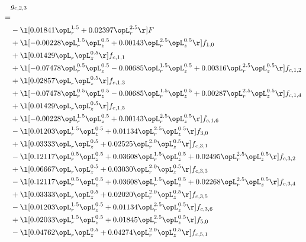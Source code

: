 \begin{alignat}{2} 
\label{eq:g_23_0} 
& g_{c,2,3} \nonumber \\ 
 = \\ 
& - \l[  0.01841 \opL_r^{1.5} +  0.02397 \opL_r^{2.5}  \r] F \nonumber \\ 
& + \l[  -0.00228 \opL_r^{1.5} \opL_z^{0.5} +  0.00143 \opL_r^{2.5} \opL_z^{0.5}  \r] f_{1,0} \nonumber \\ 
& + \l[  0.01429 \opL_r \opL_z^{0.5}  \r] f_{c,1,1} \nonumber \\ 
& + \l[  -0.07478 \opL_r^{0.5} \opL_z^{0.5}   -0.00685 \opL_r^{1.5} \opL_z^{0.5} +  0.00316 \opL_r^{2.5} \opL_z^{0.5}  \r] f_{c,1,2} \nonumber \\ 
& + \l[  0.02857 \opL_r \opL_z^{0.5}  \r] f_{c,1,3} \nonumber \\ 
& + \l[  -0.07478 \opL_r^{0.5} \opL_z^{0.5}   -0.00685 \opL_r^{1.5} \opL_z^{0.5} +  0.00287 \opL_r^{2.5} \opL_z^{0.5}  \r] f_{c,1,4} \nonumber \\ 
& + \l[  0.01429 \opL_r \opL_z^{0.5}  \r] f_{c,1,5} \nonumber \\ 
& + \l[  -0.00228 \opL_r^{1.5} \opL_z^{0.5} +  0.00143 \opL_r^{2.5} \opL_z^{0.5}  \r] f_{c,1,6} \nonumber \\ 
& - \l[  0.01203 \opL_r^{1.5} \opL_z^{0.5} +  0.01134 \opL_r^{2.5} \opL_z^{0.5}  \r] f_{3,0} \nonumber \\ 
& + \l[  0.03333 \opL_r \opL_z^{0.5} +  0.02525 \opL_r^{2.0} \opL_z^{0.5}  \r] f_{c,3,1} \nonumber \\ 
& - \l[  0.12117 \opL_r^{0.5} \opL_z^{0.5} +  0.03608 \opL_r^{1.5} \opL_z^{0.5} +  0.02495 \opL_r^{2.5} \opL_z^{0.5}  \r] f_{c,3,2} \nonumber \\ 
& + \l[  0.06667 \opL_r \opL_z^{0.5} +  0.03030 \opL_r^{2.0} \opL_z^{0.5}  \r] f_{c,3,3} \nonumber \\ 
& - \l[  0.12117 \opL_r^{0.5} \opL_z^{0.5} +  0.03608 \opL_r^{1.5} \opL_z^{0.5} +  0.02268 \opL_r^{2.5} \opL_z^{0.5}  \r] f_{c,3,4} \nonumber \\ 
& + \l[  0.03333 \opL_r \opL_z^{0.5} +  0.02020 \opL_r^{2.0} \opL_z^{0.5}  \r] f_{c,3,5} \nonumber \\ 
& - \l[  0.01203 \opL_r^{1.5} \opL_z^{0.5} +  0.01134 \opL_r^{2.5} \opL_z^{0.5}  \r] f_{c,3,6} \nonumber \\ 
& + \l[  0.02033 \opL_r^{1.5} \opL_z^{0.5} +  0.01845 \opL_r^{2.5} \opL_z^{0.5}  \r] f_{5,0} \nonumber \\ 
& - \l[  0.04762 \opL_r \opL_z^{0.5} +  0.04274 \opL_r^{2.0} \opL_z^{0.5}  \r] f_{c,5,1} \nonumber \\ 

\end{alignat}
